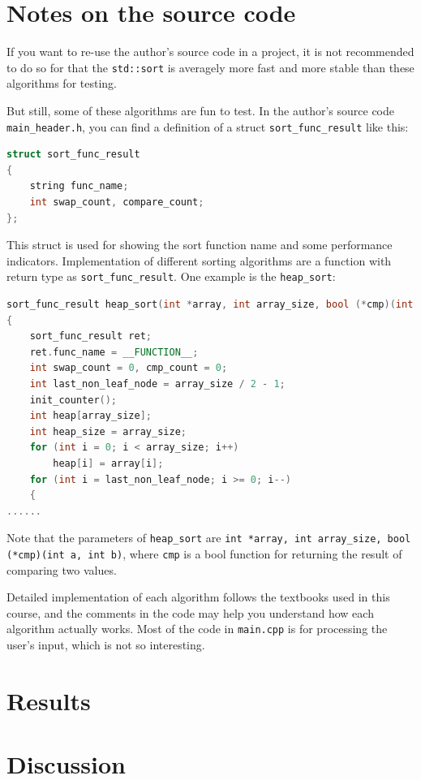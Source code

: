 \documentclass[cn,black,12pt,normal]{elegantnote}
\begin{document}
\section{Notes on the source code}

If you want to re-use the author's source code in a project, it is not recommended to do so for that the \lstinline{std::sort} is averagely more fast and more stable than these algorithms for testing.

But still, some of these algorithms are fun to test. In the author's source code \lstinline{main_header.h}, you can find a definition of a struct \lstinline{sort_func_result} like this:
\begin{lstlisting}[language = C++]
struct sort_func_result
{
	string func_name;
	int swap_count, compare_count;
};
\end{lstlisting}
This struct is used for showing the sort function name and some performance indicators. Implementation of different sorting algorithms are a function with return type as \lstinline{sort_func_result}. One example is the \lstinline{heap_sort}:
\begin{lstlisting}[language = C++]
sort_func_result heap_sort(int *array, int array_size, bool (*cmp)(int a, int b))
{
	sort_func_result ret;
	ret.func_name = __FUNCTION__;
	int swap_count = 0, cmp_count = 0;
	int last_non_leaf_node = array_size / 2 - 1;
	init_counter();
	int heap[array_size];
	int heap_size = array_size;
	for (int i = 0; i < array_size; i++)
		heap[i] = array[i];
	for (int i = last_non_leaf_node; i >= 0; i--)
	{
......
\end{lstlisting}
Note that the parameters of \lstinline{heap_sort} are \lstinline{int *array, int array_size, bool (*cmp)(int a, int b)}, where \lstinline{cmp} is a bool function for returning the result of comparing two values.

Detailed implementation of each algorithm follows the textbooks used in this course, and the comments in the code may help you understand how each algorithm actually works. Most of the code in \lstinline{main.cpp} is for processing the user's input, which is not so interesting.


\section{Results}



\section{Discussion}


\end{document}
